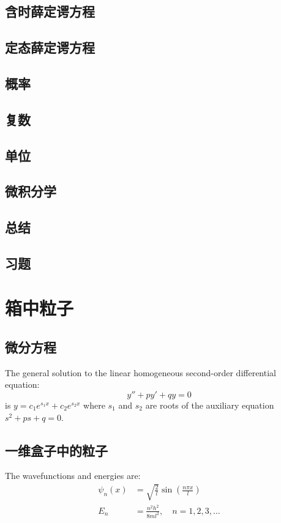 \documentclass{book}
\begin{document}
	
	\section{含时薛定谔方程}
	
	\section{定态薛定谔方程}
	
	\section{概率}
	
	\section{复数}
	
	\section{单位}
	
	\section{微积分学}
	
	\section*{总结}

	\section*{习题}
	
	\chapter{箱中粒子}
	\section{微分方程}
	The general solution to the linear homogeneous second-order differential equation:
	\begin{equation}
		y'' + py' + qy = 0
	\end{equation}
	is $y = c_1 e^{s_1 x} + c_2 e^{s_2 x}$ where $s_1$ and $s_2$ are roots of the auxiliary equation $s^2 + ps + q = 0$.
	
	\section{一维盒子中的粒子}
	The wavefunctions and energies are:
	\begin{align}
		\psi_n(x) &= \sqrt{\frac{2}{l}} \sin\left(\frac{n\pi x}{l}\right) \\
		E_n &= \frac{n^2 h^2}{8ml^2}, \quad n = 1,2,3,\ldots
	\end{align}
\end{document}
